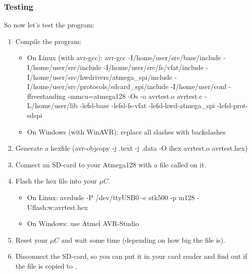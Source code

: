 \subsubsection{Testing}
So now let's test the program:
\begin{enumerate}
	\item
	{	Compile the program:
		\begin{itemize}
			\item{On Linux (with avr-gcc): avr-gcc -I/home/user/src/base/include -I/home/user/src/include -I/home/user/src/fs/vfat/include -I/home/user/src/hwdrivers/atmega\_spi/include -I/home/user/src/protocols/sdcard\_spi/include -I/home/user/conf -ffreestanding -mmcu=atmega128 -Os -o avrtest.o avrtest.c -L/home/user/lib -lefsl-base -lefsl-fs-vfat -lefsl-hwd-atmega\_spi -lefsl-prot-sdspi}
			\item{On Windows (with WinAVR): replace all slashes with backslashes}
		\end{itemize}
	}
	\item{Generate a hexfile
		(avr-objcopy -j .text -j .data -O ihex avrtest.o avrtest.hex)}
	\item{Connect an SD-card to your Atmega128 with a file called
		 on it.}
	\item
	{
		Flash the hex file into your $\mu C$.
		\begin{itemize}
			\item{On Linux: avrdude -P /dev/ttyUSB0 -c stk500 -p m128 -Uflash:w:avrtest.hex}
			\item{On Windows: use Atmel AVR-Studio}
		\end{itemize}
	}
	\item{Reset your $\mu C$ and wait some time (depending on how big
		the file  is).}
	\item{Disconnect the SD-card, so you can put it in your card reader
		and find out if the file  is copied to
		.}
\end{enumerate}
